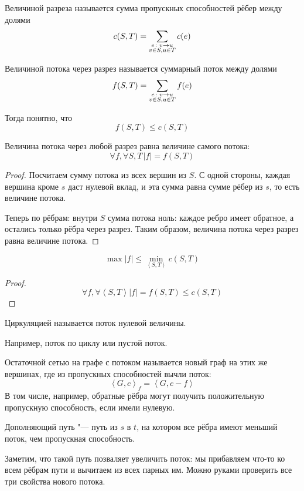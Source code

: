 \begin{Def}
	Величиной разреза называется сумма пропускных способностей рёбер между долями
	\[ c(S, T) = \sum_{\substack{e\colon v \rightarrow u \\ v \in S, u \in T}} c(e)\]
\end{Def}

\begin{Def}
	Величиной потока через разрез называется суммарный поток между долями
	\[ f(S, T) = \sum_{\substack{e\colon v \rightarrow u \\ v \in S, u \in T}} f(e)\]
\end{Def}

Тогда понятно, что
\[ f(S, T) \le c(S, T) \]

\begin{lemma}
	Величина потока через любой разрез равна величине самого потока:
	\[ \forall f, \forall S, T\, |f| = f(S, T) \]
\end{lemma}
\begin{proof}
	Посчитаем сумму потока из всех вершин из $S$.
	С одной стороны, каждая вершина кроме $s$ даст нулевой вклад, и эта сумма равна сумме рёбер из $s$, то есть величине потока.

	Теперь по рёбрам: внутри $S$ сумма потока ноль: каждое ребро имеет обратное, а остались только рёбра через разрез.
	Таким образом, величина потока через разрез равна величине потока.
\end{proof}

\begin{lemma}
	\[ \max |f| \le \min_{\left<S, T\right>} c(S, T) \]
\end{lemma}
\begin{proof}
	\[ \forall f, \forall \left<S, T\right> |f| = f(S, T) \le c(S, T) \]
\end{proof}

\begin{Def}
	Циркуляцией называется поток нулевой величины.
\end{Def}
Например, поток по циклу или пустой поток.

\begin{Def}
	Остаточной сетью на графе с потоком называется новый граф на этих же вершинах, где из пропускных способностей вычли поток:
	\[ \left<G, c\right>_f = \left<G, c - f\right> \]
	В том числе, например, обратные рёбра могут получить положительную пропускную способность, если имели нулевую.
\end{Def}

\begin{Def}
	Дополняющий путь "--- путь из $s$ в $t$, на котором все рёбра имеют меньший поток, чем пропускная способность.
\end{Def}
Заметим, что такой путь позваляет увеличить поток: мы прибавляем что-то ко всем рёбрам пути и вычитаем из всех парных им.
Можно руками проверить все три свойства нового потока.


